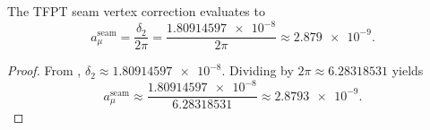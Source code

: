 \begin{theorem}\label{thm:numerical-prediction}
The TFPT seam vertex correction evaluates to
\begin{equation}\label{eq:numerical-prediction}
a_\mu^{\mathrm{seam}}
=
\frac{\delta_2}{2\pi}
=
\frac{\num{1.80914597e-8}}{2\pi}
\approx
\num{2.879e-9}.
\end{equation}
\end{theorem}

\begin{proof}
From , $\delta_2\approx\num{1.80914597e-8}$.
Dividing by $2\pi\approx\num{6.28318531}$ yields
\[
a_\mu^{\mathrm{seam}}
\approx
\frac{\num{1.80914597e-8}}{\num{6.28318531}}
\approx
\num{2.8793e-9}.
\]
\end{proof}

